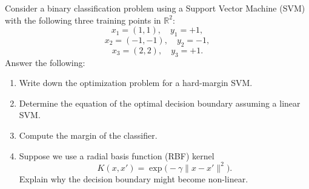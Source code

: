 \documentclass{article}
\begin{document}
\begin{enumerate}[label=\textbf{\arabic*.}]
    Consider a binary classification problem using a Support Vector Machine (SVM) with the following three training points in $\mathbb{R}^2$:
    \[
    x_1=(1,1),\quad y_1=+1,
    \]
    \[
    x_2=(-1,-1),\quad y_2=-1,
    \]
    \[
    x_3=(2,2),\quad y_3=+1.
    \]
    Answer the following:
    \begin{enumerate}[label=(\alph*)]
        \item Write down the optimization problem for a hard-margin SVM.
        \item Determine the equation of the optimal decision boundary assuming a linear SVM.
        \item Compute the margin of the classifier.
        \item Suppose we use a radial basis function (RBF) kernel 
        \[
        K(x,x')=\exp\bigl(-\gamma\|x-x'\|^2\bigr).
        \]
        Explain why the decision boundary might become non-linear.
    \end{enumerate}
    
\end{enumerate}
\end{document}
